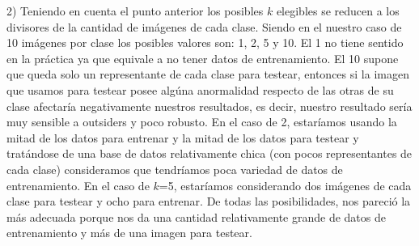 2) Teniendo en cuenta el punto anterior los posibles $k$ elegibles se reducen a los divisores de la cantidad de imágenes de cada clase. Siendo en el nuestro caso de 10 imágenes por clase los posibles valores son: 1, 2, 5 y 10. El 1 no tiene sentido en la práctica ya que equivale a no tener datos de entrenamiento. El 10 supone que queda solo un representante de cada clase para testear, entonces si la imagen que usamos para testear posee algúna anormalidad respecto de las otras de su clase afectaría negativamente nuestros resultados, es decir, nuestro resultado sería muy sensible a outsiders y poco robusto. En el caso de 2, estaríamos usando la mitad de los datos para entrenar y la mitad de los datos para testear y tratándose de una base de datos relativamente chica (con pocos representantes de cada clase) consideramos que tendríamos poca variedad de datos de entrenamiento. En el caso de $k$=5, estaríamos considerando dos imágenes de cada clase para testear y ocho para entrenar. De todas las posibilidades, nos pareció la más adecuada porque nos da una cantidad relativamente grande de datos de entrenamiento y más de una imagen para testear. 
